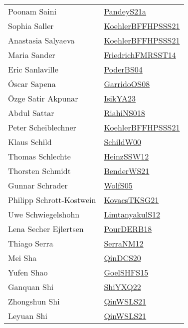 {\begin{longtable}{p{4cm}p{20cm}}
Poonam Saini & \href{articles/PandeyS21a.pdf}{PandeyS21a}\cite{PandeyS21a} \\
Sophia Saller & \href{articles/KoehlerBFFHPSSS21.pdf}{KoehlerBFFHPSSS21}\cite{KoehlerBFFHPSSS21} \\
Anastasia Salyaeva & \href{articles/KoehlerBFFHPSSS21.pdf}{KoehlerBFFHPSSS21}\cite{KoehlerBFFHPSSS21} \\
Maria Sander & \href{}{FriedrichFMRSST14}\cite{FriedrichFMRSST14} \\
Eric Sanlaville & \href{articles/PoderBS04.pdf}{PoderBS04}\cite{PoderBS04} \\
{\'{O}}scar Sapena & \href{articles/GarridoOS08.pdf}{GarridoOS08}\cite{GarridoOS08} \\
{\"{O}}zge Satir Akpunar & \href{articles/IsikYA23.pdf}{IsikYA23}\cite{IsikYA23} \\
Abdul Sattar & \href{}{RiahiNS018}\cite{RiahiNS018} \\
Peter Scheiblechner & \href{articles/KoehlerBFFHPSSS21.pdf}{KoehlerBFFHPSSS21}\cite{KoehlerBFFHPSSS21} \\
Klaus Schild & \href{articles/SchildW00.pdf}{SchildW00}\cite{SchildW00} \\
Thomas Schlechte & \href{articles/HeinzSSW12.pdf}{HeinzSSW12}\cite{HeinzSSW12} \\
Thorsten Schmidt & \href{papers/BenderWS21.pdf}{BenderWS21}\cite{BenderWS21} \\
Gunnar Schrader & \href{papers/WolfS05.pdf}{WolfS05}\cite{WolfS05} \\
Philipp Schrott{-}Kostwein & \href{papers/KovacsTKSG21.pdf}{KovacsTKSG21}\cite{KovacsTKSG21} \\
Uwe Schwiegelshohn & \href{articles/LimtanyakulS12.pdf}{LimtanyakulS12}\cite{LimtanyakulS12} \\
Lena Secher Ejlertsen & \href{articles/PourDERB18.pdf}{PourDERB18}\cite{PourDERB18} \\
Thiago Serra & \href{papers/SerraNM12.pdf}{SerraNM12}\cite{SerraNM12} \\
Mei Sha & \href{articles/QinDCS20.pdf}{QinDCS20}\cite{QinDCS20} \\
Yufen Shao & \href{articles/GoelSHFS15.pdf}{GoelSHFS15}\cite{GoelSHFS15} \\
Ganquan Shi & \href{}{ShiYXQ22}\cite{ShiYXQ22} \\
Zhongshun Shi & \href{articles/QinWSLS21.pdf}{QinWSLS21}\cite{QinWSLS21} \\
Leyuan Shi & \href{articles/QinWSLS21.pdf}{QinWSLS21}\cite{QinWSLS21} \\

\end{longtable}}
